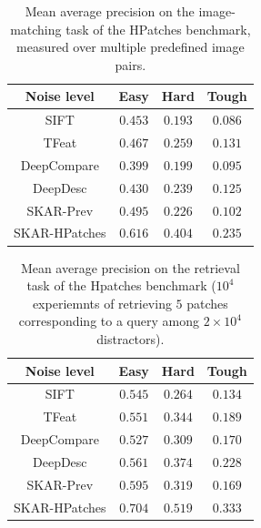 \documentclass[10pt,conference,a4paper]{IEEEtran}
\begin{document}
		\begin{table}
			\centering
			\resizebox{0.85\columnwidth}{!}
			{
			\begin{tabular}{|c||c|c|c|}
				\hline
				Noise level	&	Easy	&	Hard	&	Tough	\\
				\hline
				\hline
				SIFT \cite{sift}	&	$0.453$	&	$0.193$	&	$0.086$	\\
				\hline
				TFeat \cite{tfeat}	&	$0.467$	&	$0.259$	&	$0.131$	\\
				\hline
				DeepCompare \cite{zagoruyko}	&	$0.399$	&	$0.199$	&	$0.095$	\\
				\hline
				DeepDesc \cite{convdesc}	&	$0.430$	&	$0.239$	&	$0.125$	\\
				\hline
				\hline
				SKAR-Prev	&	$0.495$	&	$0.226$	&	$0.102$	\\
				\hline
				SKAR-HPatches	&	$\mathbf{0.616}$	&	$\mathbf{0.404}$	&	$\mathbf{0.235}$	\\
				\hline
			\end{tabular}
			}
			\caption
			{
				Mean average precision on the image-matching task of the HPatches benchmark, measured over multiple predefined image pairs.
			}
			\label{tbl:hpatches-matching}
		\end{table}
		\begin{table}
			\centering
			\resizebox{0.85\columnwidth}{!}
			{
			\begin{tabular}{|c||c|c|c|}
				\hline
				Noise level	&	Easy	&	Hard	&	Tough	\\
				\hline
				\hline
				SIFT \cite{sift}	&	$0.545$	&	$0.264$	&	$0.134$	\\
				\hline
				TFeat \cite{tfeat}	&	$0.551$	&	$0.344$	&	$0.189$	\\
				\hline
				DeepCompare \cite{zagoruyko}	&	$0.527$	&	$0.309$	&	$0.170$	\\
				\hline
				DeepDesc \cite{convdesc}	&	$0.561$	&	$0.374$	&	$0.228$	\\
				\hline
				\hline
				SKAR-Prev	&	$0.595$	&	$0.319$	&	$0.169$	\\
				\hline
				SKAR-HPatches	&	$\mathbf{0.704}$	&	$\mathbf{0.519}$	&	$\mathbf{0.333}$	\\
				\hline
			\end{tabular}
			}
			\caption
			{
				Mean average precision on the retrieval task of the Hpatches benchmark
				($10^4$ experiemnts of retrieving $5$ patches corresponding to a query among $2\times 10^4$ distractors).
			}
			\label{tbl:hpatches-retrieval}
		\end{table}
\end{document}

